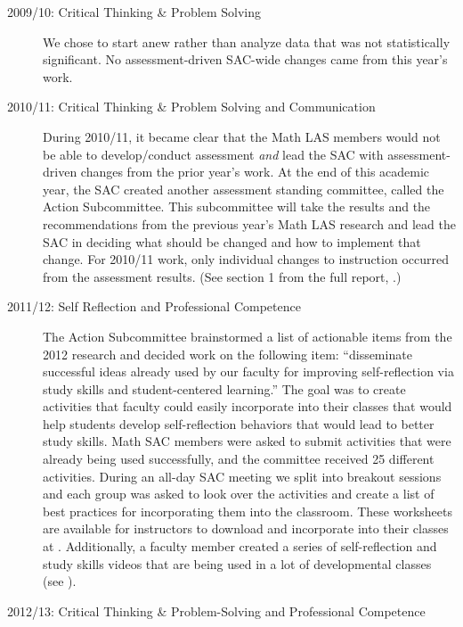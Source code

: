 \begin{description}
\item[2009/10: Critical Thinking \& Problem Solving]

We chose to start anew rather than analyze data that was not statistically
significant.  No assessment-driven SAC-wide changes came from this year's work.

\item[2010/11:  Critical Thinking \& Problem Solving and Communication]

During 2010/11, it became clear that the Math LAS members would not be able to
develop/conduct assessment \emph{and} lead the SAC with assessment-driven
changes from the prior year's work.  At the end of this academic year, the SAC
created another assessment standing committee, called the Action Subcommittee.
This subcommittee will take the results and the recommendations from the
previous year's Math LAS research and lead the SAC in deciding what should be
changed and how to implement that change.  For 2010/11 work, only individual
changes to instruction occurred from the assessment results.  (See section 1
from the full report, \cite{annualLASreport2010}.) 

\item[2011/12: Self Reflection and Professional Competence]

The Action Subcommittee brainstormed a list of actionable items from the 2012
research and decided work on the following item: ``disseminate successful ideas
already used by our faculty for improving self-reflection via study skills and
student-centered learning.''  The goal was to create activities that faculty
could easily incorporate into their classes that would help students develop
self-reflection behaviors that would lead to better study skills.  Math SAC
members were asked to submit activities that were already being used
successfully, and the committee received 25 different activities.  During an
all-day SAC meeting we split into breakout sessions and each group was asked to
look over the activities and create a list of best practices for incorporating
them into the classroom. These worksheets are available for instructors to
download and incorporate into their classes at \cite{selfcenteredlearning}.
Additionally, a faculty member created a series of self-reflection and study
skills videos that are being used in a lot of developmental classes (see
).

\item[2012/13:  Critical Thinking \& Problem-Solving and Professional Competence]


\end{description}
